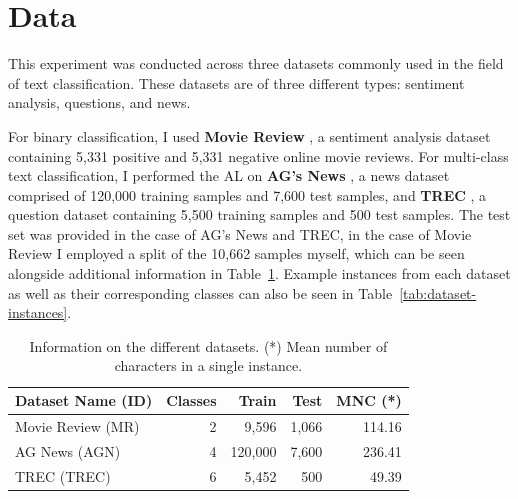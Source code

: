 \documentclass[english,bachelor,ul]{webisthesis} %
\begin{document}
\section{Data}

This experiment was conducted across three datasets commonly used in the field of text classification. These datasets are of three different types: sentiment analysis, questions, and news. 

For binary classification, I used \textbf{Movie Review} \citep{DBLP:conf/acl/PangL05}, a sentiment analysis dataset containing 5,331 positive and 5,331 negative online movie reviews. For multi-class text classification, I performed the AL on \textbf{AG's News} \citep{DBLP:conf/nips/ZhangZL15}, a news dataset comprised of 120,000 training samples and 7,600 test samples, and \textbf{TREC} \citep{DBLP:journals/nle/LiR06}, a question dataset containing 5,500 training samples and 500 test samples. The test set was provided in the case of AG's News and TREC, in the case of Movie Review I employed a split of the 10,662 samples myself, which can be seen alongside additional information in Table~\ref{tab:dataset-table}. Example instances from each dataset as well as their corresponding classes can also be seen in Table~\ref{tab:dataset-instances}.

\vspace{1\baselineskip}

\begin{table}[htpb]
    \centering
    \setlength{\tabcolsep}{16pt} %
    \begin{tabular}{@{}lrrrr@{}} %
        \toprule
        \bfseries Dataset Name \scriptsize (ID) & \bfseries Classes & \bfseries Train & \bfseries Test & \bfseries MNC (*) \\
        \midrule
        Movie Review \scriptsize (MR) & 2 & 9,596 & 1,066 & 114.16 \\
        AG News \scriptsize (AGN) & 4 & 120,000 & 7,600 &  236.41 \\
        TREC \scriptsize (TREC) & 6 & 5,452 & 500 & 49.39 \\
        \bottomrule
    \end{tabular}
    \caption{Information on the different datasets. (*) Mean number of characters in a single instance.}
  \label{tab:dataset-table}%
\end{table}
\end{document}
